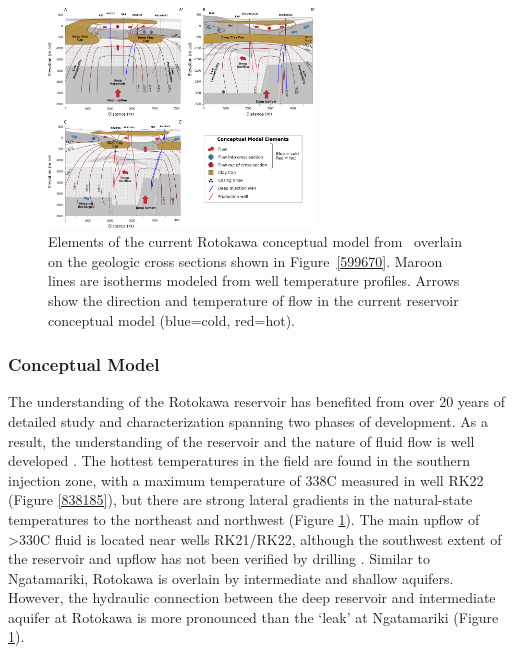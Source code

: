 \begin{figure}
\begin{center}
\includegraphics[width=0.63\textwidth,height=\textheight,keepaspectratio]{Chapter_1_Intro/figures/Rotokawa_conceptual_11-22/Rotokawa_conceptual_2-20}
\caption[Selected cross-sections of the Rotokawa conceptual model]{{
Elements of the current Rotokawa conceptual model
from~\protect\citet{Sewell_2015} overlain on the geologic cross sections shown in
Figure~{\ref{599670}}. Maroon lines are isotherms
modeled from well temperature profiles. Arrows show the direction and
temperature of flow in the current reservoir conceptual model
(blue=cold, red=hot).
{\label{889233}}%
}}
\end{center}
\end{figure}

\subsubsection{Conceptual Model}
The understanding of the Rotokawa reservoir has benefited from over 20 years of detailed study and characterization spanning two phases of development. As a result, the understanding of the reservoir and the nature of fluid flow is well developed \citep{Sewell_2015,Addison_2017stanford,wallis2013}. The hottest temperatures in the field are found in the southern injection zone, with a maximum temperature of 338\textdegree C measured in well RK22 (Figure \ref{838185}), but there are strong lateral gradients in the natural-state temperatures to the northeast and northwest \citep{Sewell_2015,wallis2013} (Figure \ref{889233}). The main upflow of \textgreater330\textdegree C fluid is located near wells RK21\slash{RK22}, although the southwest extent of the reservoir and upflow has not been verified by drilling \citep{Sewell_2015,winick2011natural}. Similar to Ngatamariki, Rotokawa is overlain by intermediate and shallow aquifers. However, the hydraulic connection between the deep reservoir and intermediate aquifer at Rotokawa is more pronounced than the `leak' at Ngatamariki \citep{winick2011natural} (Figure \ref{889233}).

